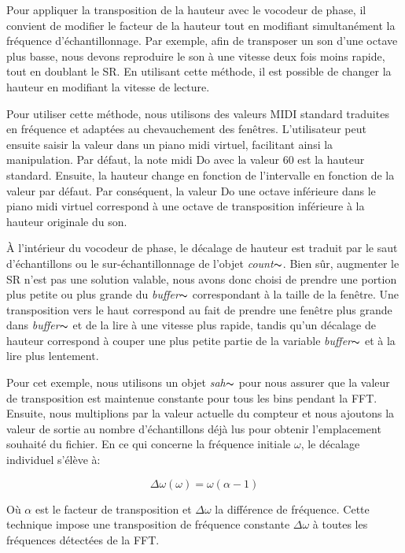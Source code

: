     Pour appliquer la transposition de la hauteur avec le vocodeur de phase, il convient de modifier le facteur de la hauteur tout en modifiant simultanément la fréquence d'échantillonnage. Par exemple, afin de transposer un son d'une octave plus basse, nous devons reproduire le son à une vitesse deux fois moins rapide, tout en doublant le SR. En utilisant cette méthode, il est possible de changer la hauteur en modifiant la vitesse de lecture.

    Pour utiliser cette méthode, nous utilisons des valeurs MIDI standard traduites en fréquence et adaptées au chevauchement des fenêtres. L'utilisateur peut ensuite saisir la valeur dans un piano midi virtuel, facilitant ainsi la manipulation. Par défaut, la note midi Do avec la valeur 60 est la hauteur standard. Ensuite, la hauteur change en fonction de l'intervalle en fonction de la valeur par défaut. Par conséquent, la valeur Do une octave inférieure dans le piano midi virtuel correspond à une octave de transposition inférieure à la hauteur originale du son.

    À l'intérieur du vocodeur de phase, le décalage de hauteur est traduit par le saut d'échantillons ou le sur-échantillonnage de l'objet  \textit{count}$\thicksim $. Bien sûr, augmenter le SR n'est pas une solution valable, nous avons donc choisi de prendre une portion plus petite ou plus grande du \textit{buffer}$\thicksim $ correspondant à la taille de la fenêtre. Une transposition vers le haut correspond au fait de prendre une fenêtre plus grande dans \textit{buffer}$\thicksim $ et de la lire à une vitesse plus rapide, tandis qu'un décalage de hauteur correspond à couper une plus petite partie de la variable \textit{buffer}$\thicksim $ et à la lire plus lentement.

    Pour cet exemple, nous utilisons un objet \textit{sah}$\thicksim $ pour nous assurer que la valeur de transposition est maintenue constante pour tous les bins pendant la FFT. Ensuite, nous multiplions par la valeur actuelle du compteur et nous ajoutons la valeur de sortie au nombre d'échantillons déjà lus pour obtenir l'emplacement souhaité du fichier. En ce qui concerne la fréquence initiale $ \omega $, le décalage individuel s’élève à:

    \begin{equation*}
        \Delta \omega(\omega) = \omega (\alpha - 1)
    \end{equation*}

    Où $ \alpha $ est le facteur de transposition et $ \Delta \omega $ la différence de fréquence. Cette technique impose une transposition de fréquence constante $ \Delta \omega $ à toutes les fréquences détectées de la FFT.

